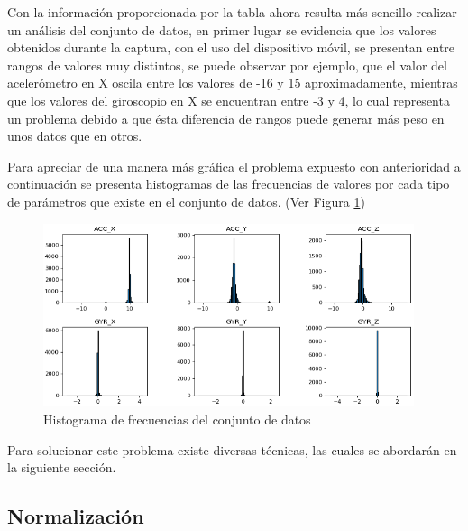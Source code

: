 \vspace{5mm} %

Con la informaci\'{o}n proporcionada por la tabla ahora resulta m\'{a}s sencillo realizar un an\'{a}lisis del conjunto de datos, en primer lugar se evidencia que los valores obtenidos durante la captura, con el uso del dispositivo m\'{o}vil, se presentan entre rangos de valores muy distintos, se puede observar por ejemplo, que el valor del aceler\'{o}metro en X oscila entre los valores de -16 y 15 aproximadamente, mientras que los valores del giroscopio en X se encuentran entre -3 y 4, lo cual representa un problema debido a que \'{e}sta diferencia de rangos puede generar m\'{a}s peso en unos datos que en otros.

\vspace{5mm} %

Para apreciar de una manera m\'{a}s gr\'{a}fica el problema expuesto con anterioridad a continuaci\'{o}n se presenta histogramas de las frecuencias de valores por cada tipo de par\'{a}metros que existe en el conjunto 
de datos. (Ver Figura \ref{fig:hist})

\begin{figure}[h!]
  \begin{center}	\includegraphics[width=0.97\textwidth]{imagenes/histogramaNormal}
  \caption{Histograma de frecuencias del conjunto de datos}
  \label{fig:hist}
  \end{center}
\end{figure}

Para solucionar este problema existe diversas t\'{e}cnicas, las cuales se abordar\'{a}n en la siguiente secci\'{o}n.

\subsection{Normalizaci\'{o}n}

